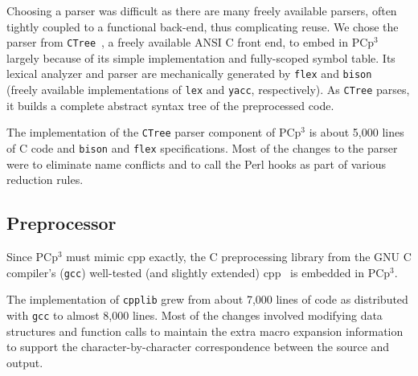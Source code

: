 \documentclass{article}
\newcommand{\pcp}{\mbox{\textsf{PCp}$^3$}}
\newcommand{\Cpp}{\mbox{\textsf{cpp}}}
\newcommand{\Perl}{\mbox{Perl}}
\newcommand{\C}{\mbox{C}}
\begin{document}
Choosing a parser was difficult as there are many freely available
parsers, often tightly coupled to a functional back-end, thus
complicating reuse.  We chose the parser from \texttt{CTree}~\cite{CTree}, a
freely available ANSI \C{} front end, to embed in \pcp{}
largely because of its simple implementation and fully-scoped symbol
table.  Its lexical analyzer and parser are mechanically generated
by \texttt{flex} and \texttt{bison}~\cite{BisonAndFlex,Levine92} (freely
available implementations of \texttt{lex} and \texttt{yacc},
respectively).  As \texttt{CTree} parses, it builds a complete abstract
syntax tree of the preprocessed code.

The implementation of the \texttt{CTree} parser component of \pcp{} is
about 5,000 lines of \C{} code and \texttt{bison} and \texttt{flex}
specifications.  Most of the changes to the parser were to eliminate
name conflicts and to call the \Perl{} hooks as part of various
reduction rules.


\subsection*{Preprocessor}
\label{ssec:preprocessor}


Since \pcp{} must mimic \Cpp{} exactly, the \C{}
preprocessing library from the GNU \C{} compiler's (\texttt{gcc})
well-tested (and slightly extended) \Cpp{}~\cite{GCC} is embedded in
\pcp{}.  


The implementation of \texttt{cpplib} grew from about 7,000 lines of
code as distributed with \texttt{gcc} to almost 8,000 lines.  Most of
the changes involved modifying data structures and function calls to
maintain the extra macro expansion information to support the
character-by-character correspondence between the source and output.
\end{document}
